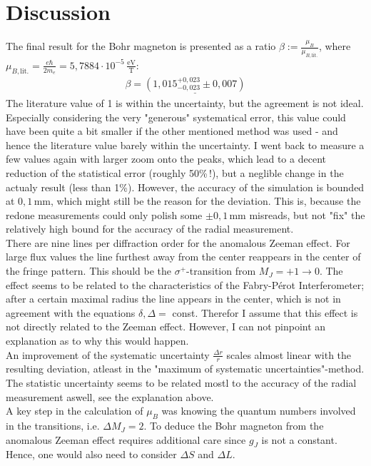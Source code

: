 \documentclass[a4paper,12pt]{article}
\newcommand{\kla}{}
\newcommand{\tecxt}{}
\begin{document}
\section{Discussion}
The final result for the Bohr magneton is presented as a ratio $\beta:=\frac{\mu_B}{\mu_{B,\tecxt\text{lit.}}}$, where $\mu_{B,\tecxt\text{lit.}}=\frac{e\hbar}{2m_e}=5,7884\cdot 10^{-5}\,\frac{\tecxt\text{eV}}{\tecxt\text{T}}$:
\begin{align*}
\beta=\underline{\kla\left( {1,015_{-0,023}^{+0,023}\pm 0,007
} \right)}
\end{align*}
The literature value of 1 is within the uncertainty, but the agreement is not ideal. Especially considering the very "generous" systematical error, this value could have been quite a bit smaller if the other mentioned method was used - and hence the literature value barely within the uncertainty. I went back to measure a few values again with larger zoom onto the peaks, which lead to a decent reduction of the statistical error (roughly 50\%\,!), but a neglible change in the actualy result (less than 1\%). However, the accuracy of the simulation is bounded at $0,1\,$mm, which might still be the reason for the deviation. This is, because the redone measurements could only polish some $\pm 0,1\,$mm misreads, but not "fix" the relatively high bound for the accuracy of the radial measurement.\\
There are nine lines per diffraction order for the anomalous Zeeman effect. For large flux values the line furthest away from the center reappears in the center of the fringe pattern. This should be the $\sigma^+$-transition from $M_J=+1\rightarrow 0$. The effect seems to be related to the characteristics of the Fabry-Pérot Interferometer; after a certain maximal radius the line appears in the center, which is not in agreement with the equations $\delta,\Delta=$ const. Therefor I assume that this effect is not directly related to the Zeeman effect. However, I can not pinpoint an explanation as to why this would happen.\\
An improvement of the systematic uncertainty $\frac{\Delta r}{r}$ scales almost linear with the resulting deviation, atleast in the "maximum of systematic uncertainties"-method. The statistic uncertainty seems to be related mostl to the accuracy of the radial measurement aswell, see the explanation above. \\
A key step in the calculation of $\mu_B$ was knowing the quantum numbers involved in the transitions, i.e. $\Delta M_J=2$. To deduce the Bohr magneton from the anomalous Zeeman effect requires additional care since $g_J$ is not a constant. Hence, one would also need to consider $\Delta S$ and $\Delta L$.
\end{document}
